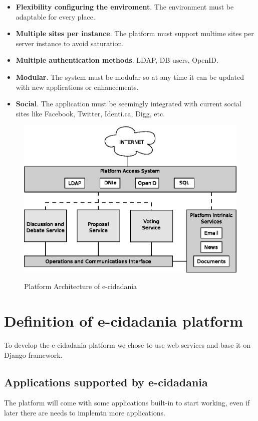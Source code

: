 \documentclass[12pt,a4paper]{article}
\begin{document}
\begin{itemize}
\item {\bf Flexibility configuring the enviroment}. The environment must be adaptable for every place.
\item {\bf Multiple sites per instance}. The platform must support multime sites per server instance to avoid saturation.
\item {\bf Multiple authentication methods}. LDAP, DB users, OpenID.
\item {\bf Modular}. The system must be modular so at any time it can be updated with new applications or enhancements.
\item {\bf Social}. The application must be seemingly integrated with current social sites like Facebook, Twitter, Identi.ca, Digg, etc.
\end{itemize}

\newpage

\begin{figure}
	\centering
		\includegraphics[scale=1]{./architecture.eps}\\
	\caption{Platform Architecture of e-cidadania}

\end{figure}

\section{Definition of e-cidadania platform}
To develop the e-cidadania platform we chose to use web services and base it on Django framework.

\subsection{Applications supported by e-cidadania}
The platform will come with some applications built-in to start working, even if later there are needs to implemtn more applications.
\end{document}
